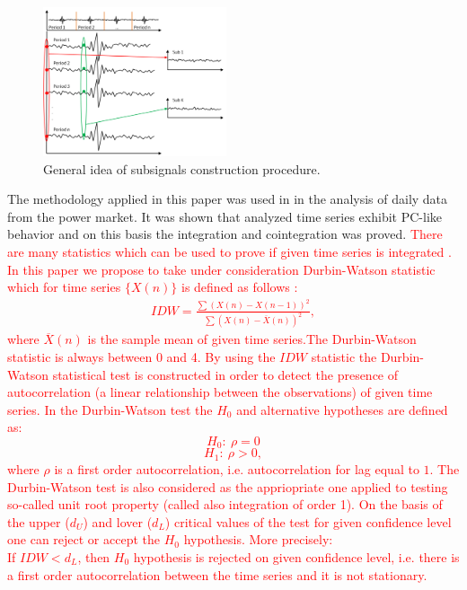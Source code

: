 \documentclass[preprint]{elsarticle}
\begin{document}
\begin{figure}[ht!]
\centering
\includegraphics[width=0.48\textwidth]{wykresy/subsignals_scheme}
\caption{General idea of subsignals construction procedure.}
\label{fig:subsignals_scheme}
\end{figure}
The methodology applied in this paper was used in \cite{broszkiewiczperiodic} in the analysis of daily data from the power market. It was shown that analyzed time series exhibit PC-like behavior and on this basis the integration and cointegration was proved.\textcolor{red}{ There are many statistics which can be used to prove if given time series is integrated \cite{dickey1979distribution,kwiatkowski1992testing}. In this paper we propose to take under consideration Durbin-Watson statistic which for time series $\{X(n)\}$ is defined  as follows \cite{broszkiewiczperiodic}:
\begin{equation}
\label{eq:IDW}
\begin{gathered}
IDW=\frac{\sum\left(X(n)-X(n-1)\right)^2}{\sum\left(X(n)-\overline{X}(n)\right)^2},
\end{gathered}
\end{equation}
where $\overline{X}(n)$ is the sample mean of given time series.The Durbin-Watson statistic is always between 0 and 4. By using the $IDW$ statistic the  Durbin-Watson statistical test is constructed in order to detect the presence of autocorrelation (a linear relationship between the observations) of given time series. In the Durbin-Watson test the $H_0$ and alternative hypotheses are defined as:
\[H_0:~\rho=0\]
\[H_1:~\rho>0,\]
where $\rho$ is a first order autocorrelation, i.e. autocorrelation for lag equal to $1$.  The Durbin-Watson test is also considered as the appriopriate one applied to testing so-called unit root property (called also integration of order 1). On the basis of the upper ($d_U$) and lover ($d_L$) critical values of the test for given confidence level  one can reject or accept the $H_0$ hypothesis. More precisely:\\
If $IDW<d_L$, then $H_0$ hypothesis is rejected on given confidence level, i.e. there is  a first order autocorrelation between the time series and it is not stationary.\\
}
\end{document}
